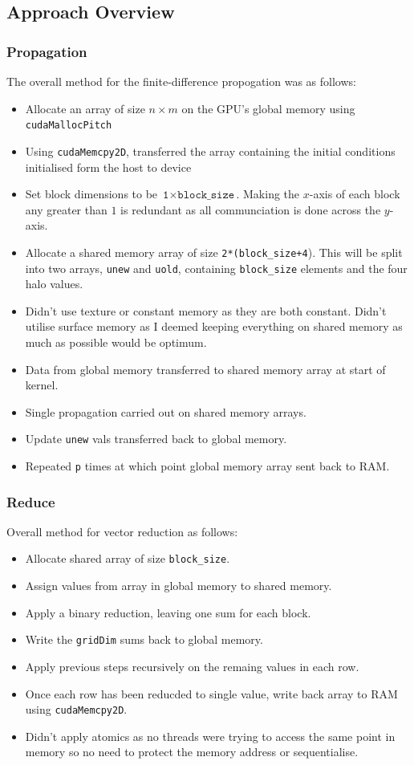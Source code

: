 \documentclass[12pt]{article}
\begin{document}
\subsection*{Approach Overview}
\subsubsection*{Propagation}
	The overall method for the finite-difference propogation was as follows:
	\begin{itemize}
	\item Allocate an array of size $n\times m$ on the GPU's global memory using \texttt{cudaMallocPitch}
	\item Using \texttt{cudaMemcpy2D}, transferred the array containing the initial conditions initialised form the host to device
	\item Set block dimensions to be $\texttt{1}\times\texttt{block\_size}$. Making the $x$-axis of each block any greater than $1$ is redundant as all communciation is done across the $y$-axis.
	\item Allocate a shared memory array of size \texttt{2*(block\_size+4}). This will be split into two arrays, \texttt{unew} and \texttt{uold}, containing \texttt{block\_size} elements and the four halo values.
	\item Didn't use texture or constant memory as they are both constant. Didn't utilise surface memory as I deemed keeping everything on shared memory as much as possible would be optimum.
	\item Data from global memory transferred to shared memory array at start of kernel.
	\item Single propagation carried out on shared memory arrays.
	\item Update \texttt{unew} vals transferred back to global memory.
	\item Repeated \texttt{p} times at which point global memory array sent back to RAM. 
	\end{itemize}
\subsubsection*{Reduce}
	Overall method for vector reduction as follows:
	\begin{itemize}
	\item Allocate shared array of size \texttt{block\_size}.
	\item Assign values from array in global memory to shared memory.
	\item Apply a binary reduction, leaving one sum for each block.
	\item Write the \texttt{gridDim} sums back to global memory.
	\item Apply previous steps recursively on the remaing values in each row.
	\item Once each row has been reducded to single value, write back array to RAM using \texttt{cudaMemcpy2D}.
	\item Didn't apply atomics as no threads were trying to access the same point in memory so no need to protect the memory address or sequentialise.
	\end{itemize}
	\pagebreak
\end{document}

